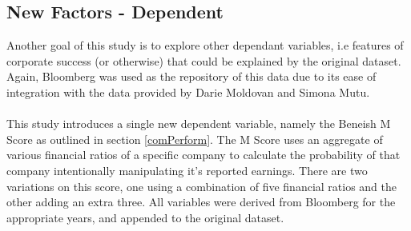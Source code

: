 \subsection{New Factors - Dependent}
{Another goal of this study is to explore other dependant variables, i.e features of corporate success (or otherwise) that could be explained by the original dataset. Again, Bloomberg was used as the repository of this data due to its ease of integration with the data provided by Darie Moldovan and Simona Mutu.}\\\\
{This study introduces a single new dependent variable, namely the Beneish M Score as outlined in section \ref{comPerform}. The M Score uses an aggregate of various financial ratios of a specific company to calculate the probability of that company intentionally manipulating it's reported earnings. There are two variations on this score, one using a combination of five financial ratios and the other adding an extra three. All variables were derived from Bloomberg for the appropriate years, and appended to the original dataset.   
  }

